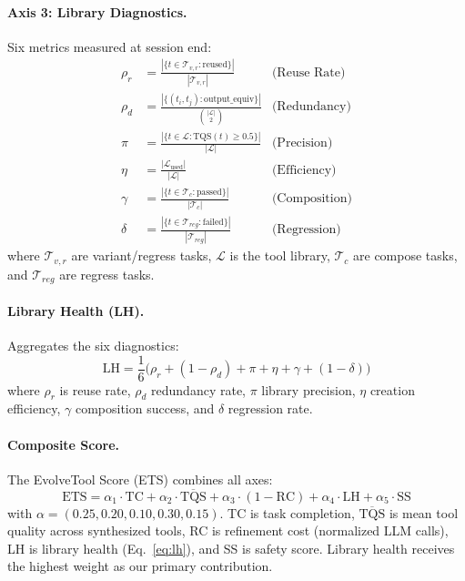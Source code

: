 \documentclass[10pt,twocolumn]{article}
\begin{document}
\paragraph{Axis 3: Library Diagnostics.} Six metrics measured at session end:
\begin{align}
\rho_r &= \frac{|\{t \in \mathcal{T}_{v,r} : \text{reused}\}|}{|\mathcal{T}_{v,r}|} & \text{(Reuse Rate)} \label{eq:reuse} \\[2pt]
\rho_d &= \frac{|\{(t_i,t_j) : \text{output\_equiv}\}|}{\binom{|\mathcal{L}|}{2}} & \text{(Redundancy)} \label{eq:redund} \\[2pt]
\pi &= \frac{|\{t \in \mathcal{L} : \text{TQS}(t) \geq 0.5\}|}{|\mathcal{L}|} & \text{(Precision)} \label{eq:prec} \\[2pt]
\eta &= \frac{|\mathcal{L}_{\text{used}}|}{|\mathcal{L}|} & \text{(Efficiency)} \label{eq:eff} \\[2pt]
\gamma &= \frac{|\{t \in \mathcal{T}_c : \text{passed}\}|}{|\mathcal{T}_c|} & \text{(Composition)} \label{eq:comp} \\[2pt]
\delta &= \frac{|\{t \in \mathcal{T}_{reg} : \text{failed}\}|}{|\mathcal{T}_{reg}|} & \text{(Regression)} \label{eq:reg}
\end{align}
where $\mathcal{T}_{v,r}$ are variant/regress tasks, $\mathcal{L}$ is the tool library, $\mathcal{T}_c$ are compose tasks, and $\mathcal{T}_{reg}$ are regress tasks.

\paragraph{Library Health (LH).} Aggregates the six diagnostics:
\begin{equation}
\text{LH} = \frac{1}{6}\bigl(\rho_r + (1{-}\rho_d) + \pi + \eta + \gamma + (1{-}\delta)\bigr)
\label{eq:lh}
\end{equation}
where $\rho_r$ is reuse rate, $\rho_d$ redundancy rate, $\pi$ library precision, $\eta$ creation efficiency, $\gamma$ composition success, and $\delta$ regression rate.

\paragraph{Composite Score.} The EvolveTool Score (ETS) combines all axes:
\begin{equation}
\text{ETS} = \alpha_1 \cdot \text{TC} + \alpha_2 \cdot \overline{\text{TQS}} + \alpha_3 \cdot (1{-}\text{RC}) + \alpha_4 \cdot \text{LH} + \alpha_5 \cdot \text{SS}
\label{eq:ets}
\end{equation}
with $\alpha = (0.25, 0.20, 0.10, 0.30, 0.15)$. TC is task completion, $\overline{\text{TQS}}$ is mean tool quality across synthesized tools, RC is refinement cost (normalized LLM calls), LH is library health (Eq.~\ref{eq:lh}), and SS is safety score. Library health receives the highest weight as our primary contribution.
\end{document}
